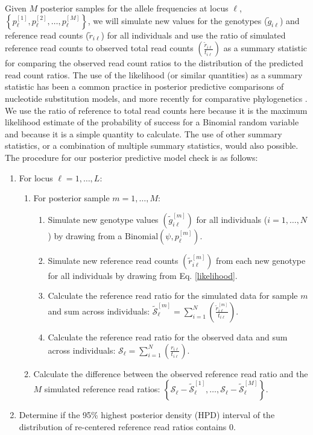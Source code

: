 \documentclass[11pt,english,letterpaper,oneside]{article}
\begin{document}
Given $M$ posterior samples for the allele frequencies at locus $\ell$, $\left\{p_{\ell}^{[1]},p_{\ell}^{[2]},\ldots,p_{\ell}^{[M]} \right\}$, we will simulate new values for the genotypes ($\tilde{g}_{i \ell}$) and reference read counts ($\tilde{r}_{i \ell}$) for all individuals and use the ratio of simulated reference read counts to observed total read counts $\left( \frac{\tilde{r}_{i \ell}}{t_{i \ell}} \right) $ as a summary statistic for comparing the observed read count ratios to the distribution of the predicted read count ratios. The use of the likelihood (or similar quantities) as a summary statistic has been a common practice in posterior predictive comparisons of nucleotide substitution models, and more recently for comparative phylogenetics \citep{ripplinger2010DNAmodels,reid2014poorfit,pennell2015adequacy}. We use the ratio of reference to total read counts here because it is the maximum likelihood estimate of the probability of success for a Binomial random variable and because it is a simple quantity to calculate. The use of other summary statistics, or a combination of multiple summary statistics, would also possible. The procedure for our posterior predictive model check is as follows:
\medskip

\begin{enumerate}
  \item For locus $\ell = 1,\ldots,L$:
  \begin{enumerate}[label={\arabic{enumi}.\arabic*.}]
    \item For posterior sample $m = 1,\ldots,M$:
    \begin{enumerate}[label={\arabic{enumi}.\arabic{enumi}.\arabic*.}]
      \item Simulate new genotype values $\left( \tilde{g}_{i \ell}^{[m]}\right)$ for all individuals ($i = 1,\ldots,N$) by drawing from a $\text{Binomial}\left( \psi,p_{\ell}^{[m]} \right)$.
      \item Simulate new reference read counts $\left( \tilde{r}_{i \ell}^{[m]} \right)$ from each new genotype for all individuals by drawing from Eq. \ref{likelihood}.
      \item Calculate the reference read ratio for the simulated data for sample $m$ and sum across individuals: $\mathcal{\tilde{S}}_{\ell}^{[m]} = \sum_{i=1}^{N} \left(\frac{\tilde{r}_{i \ell}^{[m]}}{t_{i \ell}} \right)$.
      \item Calculate the reference read ratio for the observed data and sum across individuals: $\mathcal{S}_{\ell} = \sum_{i=1}^{N} \left(\frac{r_{i \ell}}{t_{i \ell}} \right)$.
    \end{enumerate}
    \item Calculate the difference between the observed reference read ratio and the $M$ simulated reference read ratios: $\left\{ \mathcal{S}_{\ell}-\mathcal{\tilde{S}}_{\ell}^{[1]},\ldots,\mathcal{S}_{\ell}-\mathcal{\tilde{S}}_{\ell}^{[M]}\right\}$.
\end{enumerate}
\item Determine if the 95\% highest posterior density (HPD) interval of the distribution of re-centered reference read ratios contains 0.
\end{enumerate}
\medskip
\end{document}
